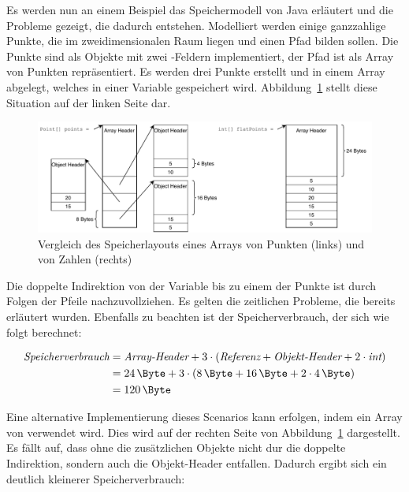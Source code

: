 Es werden nun an einem Beispiel das Speichermodell von Java erläutert und die Probleme gezeigt, die dadurch entstehen.
Modelliert werden einige ganzzahlige Punkte, die im zweidimensionalen Raum liegen und einen Pfad bilden sollen.
Die Punkte sind als Objekte mit zwei -Feldern implementiert, der Pfad ist als Array von Punkten repräsentiert.
Es werden drei Punkte erstellt und in einem Array abgelegt, welches in einer Variable gespeichert wird.
Abbildung~\ref{fig:memory-usage} stellt diese Situation auf der linken Seite dar.

\begin{figure}[htp]
    \centering
    \includegraphics[width=\textwidth]{img/memory-usage.pdf}
    \vspace{-3ex}
    \caption{Vergleich des Speicherlayouts eines Arrays von Punkten (links) und von Zahlen (rechts)}
    \label{fig:memory-usage}
\end{figure}

Die doppelte Indirektion von der Variable bis zu einem der Punkte ist durch Folgen der Pfeile nachzuvollziehen.
Es gelten die zeitlichen Probleme, die bereits erläutert wurden.
Ebenfalls zu beachten ist der Speicherverbrauch, der sich wie folgt berechnet:

\begin{equation}
    \begin{split}
        \textit{Speicherverbrauch} & = \textit{Array-Header} + 3 \cdot (\textit{Referenz} + \textit{Objekt-Header} + 2 \cdot \textit{int}) \\
        & = \SI{24}{\Byte} + 3 \cdot (\SI{8}{\Byte} + \SI{16}{\Byte} + 2 \cdot \SI{4}{\Byte}) \\
        & = \SI{120}{\Byte}\label{eq:memory-usage-current} \\
    \end{split}
\end{equation}

Eine alternative Implementierung dieses Scenarios kann erfolgen, indem ein Array von  verwendet wird.
Dies wird auf der rechten Seite von Abbildung~\ref{fig:memory-usage} dargestellt.
Es fällt auf, dass ohne die zusätzlichen Objekte nicht dur die doppelte Indirektion, sondern auch die Objekt-Header entfallen.
Dadurch ergibt sich ein deutlich kleinerer Speicherverbrauch:

